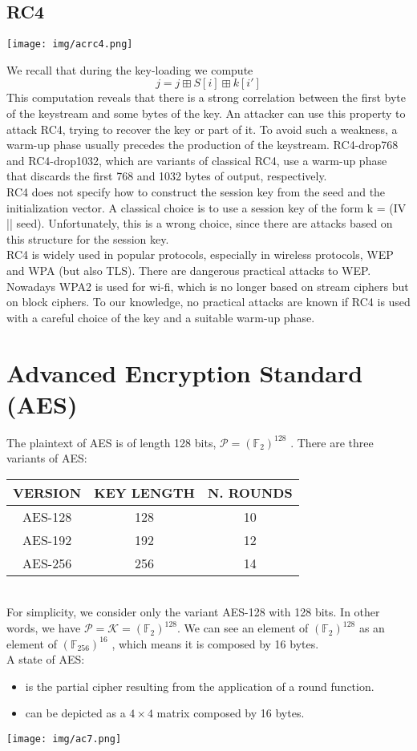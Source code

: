 \documentclass[a4paper, 10pt, titlepage]{article}
\begin{document}
\subsection{RC4}
\begin{center}
\texttt{[image: img/acrc4.png]}
\end{center}
We recall that during the key-loading we compute
$$j = j \boxplus S[i] \boxplus k[i']$$
This computation reveals that there is a strong correlation between the first byte of the keystream and some bytes of the key. An attacker can use this property to attack RC4, trying to recover the key or part of it. To avoid such a weakness, a warm-up phase usually precedes the production of the keystream. RC4-drop768 and RC4-drop1032, which are variants of classical RC4, use a warm-up phase that discards the first 768 and 1032 bytes of output, respectively. \medskip\\
RC4 does not specify how to construct the session key from the seed and the initialization vector. A classical choice is to use a session key of the form k = (IV || seed). Unfortunately, this is a wrong choice, since there are attacks based on this structure for the session key. \medskip\\
RC4 is widely used in popular protocols, especially in wireless protocols, WEP and WPA (but also TLS). There are dangerous practical attacks to WEP. Nowadays WPA2 is used for wi-fi, which is no longer based on stream ciphers but on block ciphers. To our knowledge, no practical attacks are known if RC4 is used with a careful choice of the key and a suitable warm-up phase.

\newpage
\section{Advanced Encryption Standard (AES)}
The plaintext of AES is of length 128 bits, $\mathcal{P}= (\mathbb{F}_ 2)^{128}$ . There are three variants of AES: \medskip \\
\begin{tabular}{|c|c|c|}
\hline
VERSION & KEY LENGTH & N. ROUNDS \\
\hline AES-128 & 128 & 10 \\
AES-192 & 192 & 12 \\
AES-256 & 256 & 14 \\ \hline
\end{tabular} \medskip \\
For simplicity, we consider only the variant AES-128 with 128 bits.
In other words, we have $\mathcal{P} = \mathcal{K} = (\mathbb{F}_2) ^{128}$.
We can see an element of $(\mathbb{F}_2)^{128}$ as an element of $(\mathbb{F}_{256} )^{16}$ , which means it is composed by 16 bytes. \\
A state of AES:
\begin{itemize}
\item is the partial cipher resulting from the application of a round function.
\item can be depicted as a $4 \times 4$ matrix composed by 16 bytes.
\end{itemize}
\texttt{[image: img/ac7.png]}
\end{document}
